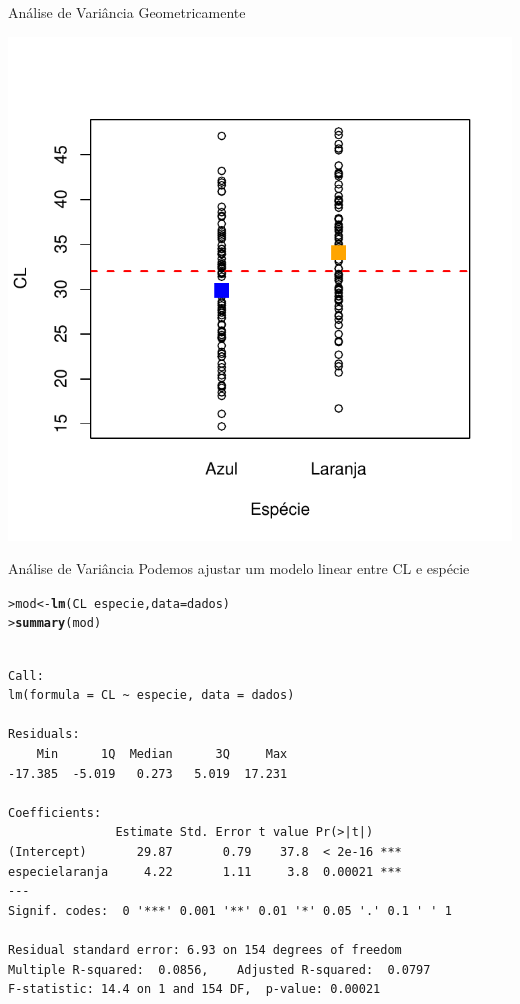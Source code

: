\documentclass[10pt]{beamer}\usepackage[]{graphicx}\usepackage[]{color}
\makeatletter
\newcommand{\hlopt}[1]{\textcolor[rgb]{0,0,0}{#1}}%
\newcommand{\hlstd}[1]{\textcolor[rgb]{0.345,0.345,0.345}{#1}}%
\newcommand{\hlkwb}[1]{\textcolor[rgb]{0.69,0.353,0.396}{#1}}%
\newcommand{\hlkwc}[1]{\textcolor[rgb]{0.333,0.667,0.333}{#1}}%
\newcommand{\hlkwd}[1]{\textcolor[rgb]{0.282,0.239,0.545}{\textbf{#1}}}%
\newenvironment{kframe}{%
 \def\at@end@of@kframe{}%
 \ifinner\ifhmode%
  \def\at@end@of@kframe{\end{minipage}}%
  \begin{minipage}{\columnwidth}%
 \fi\fi%
 \def\FrameCommand##1{\hskip\@totalleftmargin \hskip-\fboxsep
 \colorbox{shadecolor}{##1}\hskip-\fboxsep
     \hskip-\linewidth \hskip-\@totalleftmargin \hskip\columnwidth}%
 \MakeFramed {\advance\hsize-\width
   \@totalleftmargin\z@ \linewidth\hsize
   \@setminipage}}%
 {\par\unskip\endMakeFramed%
 \at@end@of@kframe}
\newenvironment{knitrout}{}{} %
\makeatother
\begin{document}
\begin{frame}[fragile=singleslide]{Análise de Variância}
Geometricamente
\begin{knitrout}\small
{}\color{fgcolor}

{\centering \includegraphics[width=.7\textwidth]{figure/unnamed-chunk-23} 

}



\end{knitrout}

\end{frame}

\begin{frame}[fragile=singleslide]{Análise de Variância}
Podemos ajustar um modelo linear entre CL e espécie
\begin{knitrout}\footnotesize
{}\color{fgcolor}\begin{kframe}
\begin{alltt}
\hlstd{> }\hlstd{mod} \hlkwb{<-} \hlkwd{lm}\hlstd{(CL} \hlopt{~} \hlstd{especie,} \hlkwc{data} \hlstd{= dados)}
\hlstd{> }\hlkwd{summary}\hlstd{(mod)}
\end{alltt}
\begin{verbatim}

Call:
lm(formula = CL ~ especie, data = dados)

Residuals:
    Min      1Q  Median      3Q     Max 
-17.385  -5.019   0.273   5.019  17.231 

Coefficients:
               Estimate Std. Error t value Pr(>|t|)    
(Intercept)       29.87       0.79    37.8  < 2e-16 ***
especielaranja     4.22       1.11     3.8  0.00021 ***
---
Signif. codes:  0 '***' 0.001 '**' 0.01 '*' 0.05 '.' 0.1 ' ' 1

Residual standard error: 6.93 on 154 degrees of freedom
Multiple R-squared:  0.0856,	Adjusted R-squared:  0.0797 
F-statistic: 14.4 on 1 and 154 DF,  p-value: 0.00021
\end{verbatim}
\end{kframe}
\end{knitrout}

\end{frame}
\end{document}
